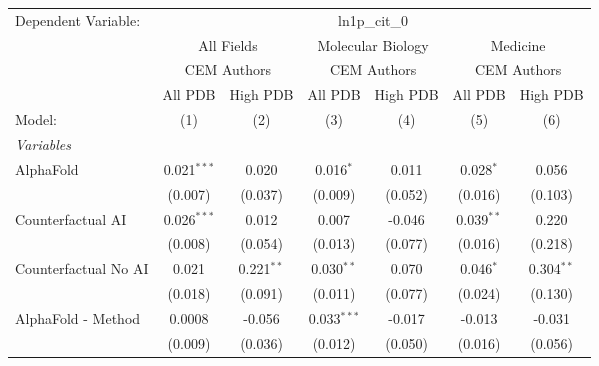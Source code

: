 \begingroup
\centering
\begin{tabular}{lcccccc}
   \tabularnewline \midrule \midrule
   Dependent Variable: & \multicolumn{6}{c}{ln1p\_cit\_0}\\
 & \multicolumn{2}{c}{All Fields} & \multicolumn{2}{c}{Molecular Biology} & \multicolumn{2}{c}{Medicine} \\
\cmidrule(lr){2-3} \cmidrule(lr){4-5} \cmidrule(lr){6-7}
 & \multicolumn{2}{c}{CEM Authors} & \multicolumn{2}{c}{CEM Authors} & \multicolumn{2}{c}{CEM Authors} \\
\cmidrule(lr){2-3} \cmidrule(lr){4-5} \cmidrule(lr){6-7}
 & \multicolumn{1}{c}{All PDB} & \multicolumn{1}{c}{High PDB} & \multicolumn{1}{c}{All PDB} & \multicolumn{1}{c}{High PDB} & \multicolumn{1}{c}{All PDB} & \multicolumn{1}{c}{High PDB} \\
\cmidrule(lr){2-2} \cmidrule(lr){3-3} \cmidrule(lr){4-4} \cmidrule(lr){5-5} \cmidrule(lr){6-6} \cmidrule(lr){7-7}
   Model:                                                     & (1)            & (2)          & (3)            & (4)     & (5)            & (6)\\  
   \midrule
   \emph{Variables}\\
   AlphaFold                                                  & 0.021$^{***}$  & 0.020        & 0.016$^{*}$    & 0.011   & 0.028$^{*}$    & 0.056\\   
                                                              & (0.007)        & (0.037)      & (0.009)        & (0.052) & (0.016)        & (0.103)\\   
   Counterfactual AI                                          & 0.026$^{***}$  & 0.012        & 0.007          & -0.046  & 0.039$^{**}$   & 0.220\\   
                                                              & (0.008)        & (0.054)      & (0.013)        & (0.077) & (0.016)        & (0.218)\\   
   Counterfactual No AI                                       & 0.021          & 0.221$^{**}$ & 0.030$^{**}$   & 0.070   & 0.046$^{*}$    & 0.304$^{**}$\\   
                                                              & (0.018)        & (0.091)      & (0.011)        & (0.077) & (0.024)        & (0.130)\\   
   AlphaFold - Method                                         & 0.0008         & -0.056       & 0.033$^{***}$  & -0.017  & -0.013         & -0.031\\   
                                                              & (0.009)        & (0.036)      & (0.012)        & (0.050) & (0.016)        & (0.056)\\   

\end{tabular}
